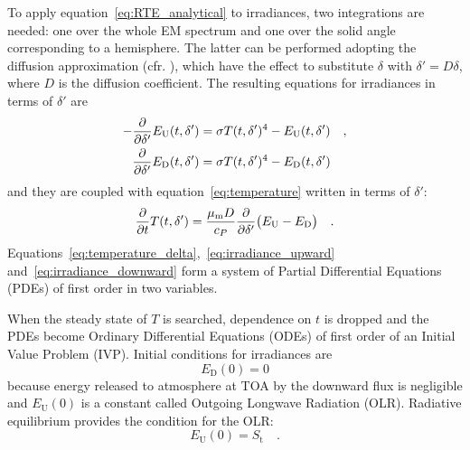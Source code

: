 \documentclass[a4paper,10pt,twocolumn,\classoptions]{article}
\begin{document}
To apply equation~\eqref{eq:RTE_analytical} to irradiances, two integrations are needed: one over the whole EM spectrum and one over the solid angle corresponding to a hemisphere. The latter can be performed adopting the diffusion approximation (cfr. \cite[55]{Catling}), which have the effect to substitute $\delta$ with $\delta' = D \delta$, where $D$ is the diffusion coefficient.
The resulting equations for irradiances in terms of $\delta'$ are
\begin{align}
  \label{eq:irradiance_upward}
  - \pdv*{E_\text{U}(t, \delta')}{\delta'} & = \sigma T(t, \delta')^4 - E_\text{U}(t, \delta') \quad , \\
  \label{eq:irradiance_downward}
  \pdv*{E_\text{D}(t, \delta')}{\delta'} & = \sigma T(t, \delta')^4 - E_\text{D}(t, \delta')
\end{align}
and they are coupled with equation~\eqref{eq:temperature} written in terms of $\delta'$:
\begin{equation}
  \label{eq:temperature_delta}
  \pdv*{T(t, \delta')}{t} = \frac{\mu_\text{m} D}{c_P} \pdv*{\big( E_\text{U} - E_\text{D} \big)}{\delta'}
  \quad .
\end{equation}
Equations~\eqref{eq:temperature_delta},~\eqref{eq:irradiance_upward} and~\eqref{eq:irradiance_downward} form a system of Partial Differential Equations (PDEs) of first order in two variables.

When the steady state of $T$ is searched, dependence on $t$ is dropped and the PDEs become Ordinary Differential Equations (ODEs) of first order of an Initial Value Problem (IVP).
Initial conditions for irradiances are
\begin{equation}
  \label{eq:initial_downward}
  E_\text{D}(0) = 0
\end{equation}
because energy released to atmosphere at TOA by the downward flux is negligible and $E_\text{U}(0)$ is a constant called Outgoing Longwave Radiation (OLR).
Radiative equilibrium provides the condition for the OLR:
\begin{equation}
  \label{eq:initial_upward}
  E_\text{U}(0) = S_\text{t}
  \quad .
\end{equation}
\end{document}
